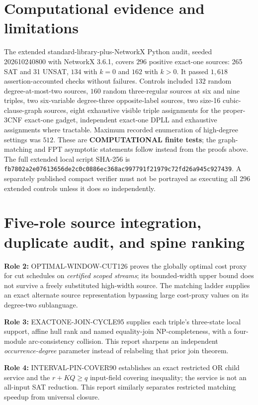 \documentclass[11pt]{article}
\begin{document}
\section{Computational evidence and limitations}
The extended standard-library-plus-NetworkX Python audit, seeded 202610240800 with NetworkX 3.6.1, covers \(296\) positive exact-one sources: 265 SAT and 31 UNSAT, \(134\) with \(k=0\) and \(162\) with \(k>0\). It passed \(1{,}618\) assertion-accounted checks without failures. Controls included \(132\) random degree-at-most-two sources, \(160\) random three-regular sources at six and nine triples, two six-variable degree-three opposite-label sources, two size-16 cubic-clause-graph sources, eight exhaustive visible triple assignments for the proper-3CNF exact-one gadget, independent exact-one DPLL and exhaustive assignments where tractable. Maximum recorded enumeration of high-degree settings was \(512\). These are \textbf{COMPUTATIONAL finite tests}; the graph-matching and FPT asymptotic statements follow instead from the proofs above. The full extended local script SHA-256 is
\texttt{fb7802a2e07613656de2c0c0886ec368ac997791f21979c72fd26a945c927439}.
A separately published compact verifier must not be portrayed as executing all 296 extended controls unless it does so independently.

\section{Five-role source integration, duplicate audit, and spine ranking}
\noindent\textbf{Role 2:} OPTIMAL-WINDOW-CUT126 proves the globally optimal cost proxy for cut schedules on \emph{certified scoped streams}; its bounded-width upper bound does not survive a freely substituted high-width source. The matching ladder supplies an exact alternate source representation bypassing large cost-proxy values on its degree-two sublanguage.

\noindent\textbf{Role 3:} EXACTONE-JOIN-CYCLE95 supplies each triple's three-state local support, affine hull rank and named equality-join NP-completeness, with a four-module arc-consistency collision. This report sharpens an independent \emph{occurrence-degree} parameter instead of relabeling that prior join theorem.

\noindent\textbf{Role 4:} INTERVAL-PIN-COVER90 establishes an exact restricted OR child service and the \(r+KQ\ge q\) input-field covering inequality; the service is not an all-input SAT reduction. This report similarly separates restricted matching speedup from universal closure.
\end{document}
